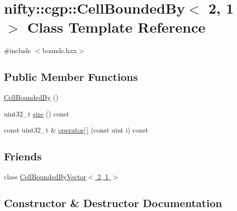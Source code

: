\hypertarget{classnifty_1_1cgp_1_1CellBoundedBy_3_012_00_011_01_4}{}\section{nifty\+:\+:cgp\+:\+:Cell\+Bounded\+By$<$ 2, 1 $>$ Class Template Reference}
\label{classnifty_1_1cgp_1_1CellBoundedBy_3_012_00_011_01_4}


{\ttfamily \#include $<$bounds.\+hxx$>$}

\subsection*{Public Member Functions}
\begin{DoxyCompactItemize}
\item 
\hyperlink{classnifty_1_1cgp_1_1CellBoundedBy_3_012_00_011_01_4_ad22d7f083d1f1ac4b379d19281b63986}{Cell\+Bounded\+By} ()
\item 
uint32\+\_\+t \hyperlink{classnifty_1_1cgp_1_1CellBoundedBy_3_012_00_011_01_4_a11cba86b898c087a7b8a8c8d60e043d4}{size} () const 
\item 
const uint32\+\_\+t \& \hyperlink{classnifty_1_1cgp_1_1CellBoundedBy_3_012_00_011_01_4_a5205405563ad994da3b1c47d6717182e}{operator\mbox{[}$\,$\mbox{]}} (const uint i) const 
\end{DoxyCompactItemize}
\subsection*{Friends}
\begin{DoxyCompactItemize}
\item 
class \hyperlink{classnifty_1_1cgp_1_1CellBoundedBy_3_012_00_011_01_4_abdb37afb9b659d234727be05e2560e42}{Cell\+Bounded\+By\+Vector$<$ 2, 1 $>$}
\end{DoxyCompactItemize}


\subsection{Constructor \& Destructor Documentation}
\hypertarget{classnifty_1_1cgp_1_1CellBoundedBy_3_012_00_011_01_4_ad22d7f083d1f1ac4b379d19281b63986}{}
